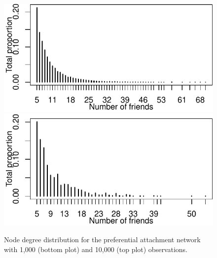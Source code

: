 \documentclass[english]{article}\usepackage[]{graphicx}\usepackage[]{color}
\makeatletter
\def\maxwidth{ %
  \ifdim\Gin@nat@width>\linewidth
    \linewidth
  \else
    \Gin@nat@width
  \fi
}
\newenvironment{knitrout}{}{} %
\theoremstyle{plain}
\theoremstyle{plain}
\makeatother
\begin{document}



\begin{knitrout}\footnotesize
{}\color{fgcolor}\begin{figure}

{\centering \includegraphics[width=\maxwidth]{TablesFigs/knitR-unnamed-chunk-4-1} 
\includegraphics[width=\maxwidth]{TablesFigs/knitR-unnamed-chunk-4-2} 

}

\caption[Node degree distribution for the preferential attachment network with 1,000 (bottom plot) and 10,000 (top plot) observations]{Node degree distribution for the preferential attachment network with 1,000 (bottom plot) and 10,000 (top plot) observations.}\label{fig:unnamed-chunk-4}
\end{figure}


\end{knitrout}
\end{document}

